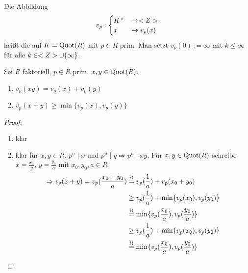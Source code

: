 \begin{definition}
	Die Abbildung
	\begin{align} %
		v_p: \begin{cases}
		K^{\times} &\to \whole\\
		x &\to v_p(x)
		\end{cases}\notag
	\end{align}
	heißt die  auf $K=\operatorname{Quot}(R)$ mit $p\in R$ prim. Man setzt $v_p(0) := \infty$ mit $k \le \infty$ für alle $k \in <Z> \cup \{\infty\}$.
\end{definition}

\begin{lemma}
	Sei $R$ faktoriell, $p \in R$ prim, $x,y \in \operatorname{Quot}(R)$.
	\begin{enumerate} %
		\item $v_p(xy) = v_p(x) + v_p(y)$
		\item $v_p(x+y) \ge \min \{v_p(x), v_p(y)\}$
	\end{enumerate}
\end{lemma}

\begin{proof}
	\begin{enumerate} %
		\item klar
		\item klar für $x,y \in R$: $p^n \mid x$ und $p^n \mid y \Rightarrow p^n \mid xy$. Für $x,y \in \operatorname{Quot}(R)$ schreibe $x = \frac{x_0}{y}$, $y = \frac{y_0}{a}$ mit $x_0, y_0, a \in R$
		\begin{align}
		\Rightarrow v_p(x+y) = v_p(\frac{x_0+y_0}{a}) &\overset{i)}{=} v_p(\frac{1}{a}) + v_p(x_0 + y_0) \notag \\
		&\ge v_p(\frac{1}{a}) + \min\{v_p(x_0), v_p(y_0)\}\notag \\
		&\overset{i)}{=} \min\{v_p(\frac{x_0}{a}), v_p(\frac{y_0}{a})\}\notag \\
		&\ge v_p(\frac{1}{a}) + \min\{v_p(x_0), v_p(y_0)\}\notag \\
		&\overset{i)}{=} \min\{v_p(\frac{x_0}{a}), v_p(\frac{y_0}{a})\}\notag
		\end{align}
		\end{enumerate}
\end{proof}

